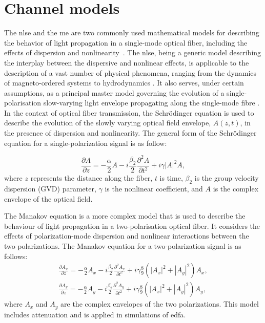 \section{Channel models}

The \acrfull{nlse} and the \acrfull{me} are two commonly used mathematical models for describing the behavior of light propagation in a single-mode optical fiber, including the effects of dispersion and nonlinearity~\cite{Agrawal2010}.
The \acrshort{nlse}, being a generic model describing the interplay between the dispersive and nonlinear effects, is applicable to the description of a vast number of physical phenomena, ranging from the dynamics of magneto-ordered systems \cite{kik90} to hydrodynamics \cite{o10}. It also serves, under certain assumptions, as a principal master model governing the evolution of a single-polarisation slow-varying light envelope propagating along the single-mode fibre \cite{a12,mg06}. In the context of optical fiber transmission, the Schr\"odinger equation is used to describe the evolution of the slowly varying optical field envelope, $A(z,t)$, in the presence of dispersion and nonlinearity. The general form of the Schr\"odinger equation for a single-polarization signal is as follow:

\begin{equation}
	\frac{\partial A }{\partial z} = - \frac{\alpha}{2} A - i \frac{\beta_2}{2} \frac{\partial^2 A}{\partial t^2} + i \gamma |A|^2 A {,}
\label{eq:nlse_att}
\end{equation}
where $z$ represents the distance along the fiber, $t$ is time, $\beta_2$ is the group velocity dispersion (GVD) parameter, $\gamma$ is the nonlinear coefficient, and $A$ is the complex envelope of the optical field.

The Manakov equation is a more complex model that is used to describe the behaviour of light propagation in a two-polarisation optical fiber. It considers the effects of polarization-mode dispersion and nonlinear interactions between the two polarizations. The Manakov equation for a two-polarization signal is as follows:
\begin{gather} 
\frac{\partial A_x}{\partial z} = -\frac{\alpha}{2} A_x - i\frac{\beta_2}{2}\frac{\partial^2 A_x}{\partial t^2} + i\gamma\frac{8}{9}\left(|A_x|^2 + |A_y|^2\right) A_x {,} \nonumber \\
\frac{\partial A_y}{\partial z} = -\frac{\alpha}{2} A_y - i\frac{\beta_2}{2}\frac{\partial^2 A_y}{\partial t^2} + i\gamma\frac{8}{9}\left(|A_x|^2 + |A_y|^2\right) A_y {,}
\label{eq:manakov_att}
\end{gather}
where $A_x$ and $A_y$ are the complex envelopes of the two polarizations. 
This model includes attenuation and is applied in simulations of \Gls{edfa}. 

